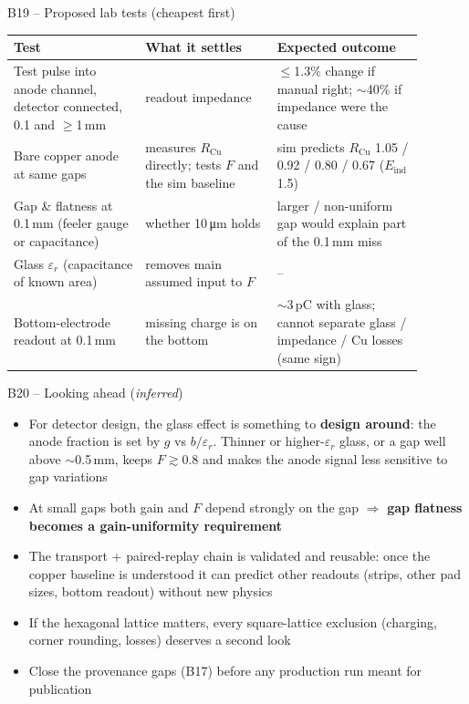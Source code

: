 \documentclass[aspectratio=169,11pt]{beamer}
\newcommand{\backlink}[1]{\hfill\hyperlink{#1}{\beamerreturnbutton{back}}}
\newcommand{\RCu}{R_\text{Cu}}
\newcommand{\Eind}{E_\text{ind}}
\newcommand{\er}{\varepsilon_r}
\begin{document}
\begin{frame}[label=b-tests]{B19 -- Proposed lab tests (cheapest first)}
  \centering\footnotesize
  \begin{tabular}{L{0.29\linewidth}L{0.29\linewidth}L{0.31\linewidth}}\toprule
    Test & What it settles & Expected outcome\\\midrule
    Test pulse into anode channel, detector connected, 0.1 and $\ge$1\,mm & readout impedance & $\le$1.3\% change if manual right; $\sim$40\% if impedance were the cause\\
    Bare copper anode at same gaps & measures $\RCu$ directly; tests $F$ and the sim baseline & sim predicts $\RCu$ 1.05 / 0.92 / 0.80 / 0.67 ($\Eind$ 1.5)\\
    Gap \& flatness at 0.1\,mm (feeler gauge or capacitance) & whether 10\,\si{\micro m} holds & larger / non-uniform gap would explain part of the 0.1\,mm miss\\
    Glass $\er$ (capacitance of known area) & removes main assumed input to $F$ & --\\
    Bottom-electrode readout at 0.1\,mm & missing charge is on the bottom & $\sim$3\,pC with glass; cannot separate glass / impedance / Cu losses (same sign)\\\bottomrule
  \end{tabular}
  \backlink{m-next}
\end{frame}

\begin{frame}[label=b-ahead]{B20 -- Looking ahead (\emph{inferred})}
  \small
  \begin{itemize}
    \item For detector design, the glass effect is something to \textbf{design around}: the anode fraction is set by $g$ vs $b/\er$. Thinner or higher-$\er$ glass, or a gap well above $\sim$0.5\,mm, keeps $F\gtrsim0.8$ and makes the anode signal less sensitive to gap variations
    \item At small gaps both gain and $F$ depend strongly on the gap $\Rightarrow$ \textbf{gap flatness becomes a gain-uniformity requirement}
    \item The transport + paired-replay chain is validated and reusable: once the copper baseline is understood it can predict other readouts (strips, other pad sizes, bottom readout) without new physics
    \item If the hexagonal lattice matters, every square-lattice exclusion (charging, corner rounding, losses) deserves a second look
    \item Close the provenance gaps (B17) before any production run meant for publication
  \end{itemize}
  \backlink{m-summary}
\end{frame}
\end{document}

